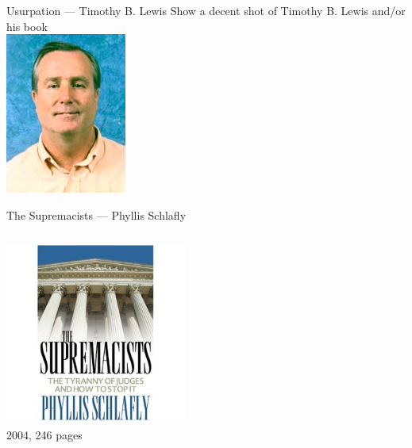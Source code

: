 \begin{frame}{Usurpation --- Timothy B. Lewis}
    Show a decent shot of Timothy B. Lewis and/or his book \\
    \includegraphics{img/timothy-lewis.png}
\end{frame}

\begin{frame}{The Supremacists --- Phyllis Schlafly}
    \begin{columns}[onlytextwidth]
            \centering
            \includegraphics[width=0.75\textwidth]{img/the-supremacists.png} \\
            2004, 246 pages \\


\end{columns}
\end{frame}
